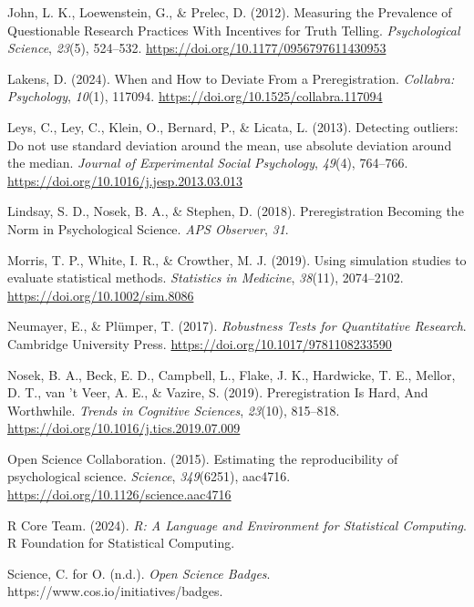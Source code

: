 \documentclass[
  man,
  floatsintext,
  longtable,
  nolmodern,
  notxfonts,
  notimes,
  colorlinks=true,linkcolor=blue,citecolor=blue,urlcolor=blue]{apa7}
\newlength{\cslhangindent}
\newenvironment{CSLReferences}[2] %
 {\begin{list}{}{%
  \setlength{\itemindent}{0pt}
  \setlength{\leftmargin}{0pt}
  \setlength{\parsep}{0pt}
  \ifodd #1
   \setlength{\leftmargin}{\cslhangindent}
   \setlength{\itemindent}{-1\cslhangindent}
  \fi
  \setlength{\itemsep}{#2\baselineskip}}}
 {\end{list}}
\begin{document}
\begin{CSLReferences}{1}{0}
John, L. K., Loewenstein, G., \& Prelec, D. (2012). Measuring the
{Prevalence} of {Questionable Research Practices With Incentives} for
{Truth Telling}. \emph{Psychological Science}, \emph{23}(5), 524--532.
\url{https://doi.org/10.1177/0956797611430953}

Lakens, D. (2024). When and {How} to {Deviate From} a {Preregistration}.
\emph{Collabra: Psychology}, \emph{10}(1), 117094.
\url{https://doi.org/10.1525/collabra.117094}

Leys, C., Ley, C., Klein, O., Bernard, P., \& Licata, L. (2013).
Detecting outliers: {Do} not use standard deviation around the mean, use
absolute deviation around the median. \emph{Journal of Experimental
Social Psychology}, \emph{49}(4), 764--766.
\url{https://doi.org/10.1016/j.jesp.2013.03.013}

Lindsay, S. D., Nosek, B. A., \& Stephen, D. (2018). Preregistration
{Becoming} the {Norm} in {Psychological Science}. \emph{APS Observer},
\emph{31}.

Morris, T. P., White, I. R., \& Crowther, M. J. (2019). Using simulation
studies to evaluate statistical methods. \emph{Statistics in Medicine},
\emph{38}(11), 2074--2102. \url{https://doi.org/10.1002/sim.8086}

Neumayer, E., \& Plümper, T. (2017). \emph{Robustness {Tests} for
{Quantitative Research}}. Cambridge University Press.
\url{https://doi.org/10.1017/9781108233590}

Nosek, B. A., Beck, E. D., Campbell, L., Flake, J. K., Hardwicke, T. E.,
Mellor, D. T., van 't Veer, A. E., \& Vazire, S. (2019). Preregistration
{Is Hard}, {And Worthwhile}. \emph{Trends in Cognitive Sciences},
\emph{23}(10), 815--818.
\url{https://doi.org/10.1016/j.tics.2019.07.009}

Open Science Collaboration. (2015). Estimating the reproducibility of
psychological science. \emph{Science}, \emph{349}(6251), aac4716.
\url{https://doi.org/10.1126/science.aac4716}

R Core Team. (2024). \emph{R: {A Language} and {Environment} for
{Statistical Computing}}. R Foundation for Statistical Computing.

Science, C. for O. (n.d.). \emph{Open {Science Badges}}.
https://www.cos.io/initiatives/badges.


\end{CSLReferences}
\end{document}
